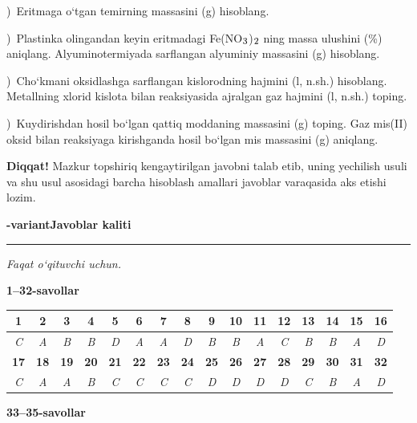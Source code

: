 \documentclass[11pt,a4paper]{article}
\renewcommand{\textsubscript}[1]{\ensuremath{_{\text{\fontsize{8}{8}\selectfont #1}}}}
\newcommand{\qsep}{\par\vspace{13pt}}
\newcommand{\diqqat}[1]{\par\smallskip\noindent\textbf{Diqqat!} #1\par\medskip}
\begin{document}
)\ Eritmaga o`tgan temirning massasini (g) hisoblang.\par
{})\ Plastinka olingandan keyin eritmadagi Fe(NO\textsubscript{3})\textsubscript{2} ning massa ulushini (\%) aniqlang. Alyuminotermiyada sarflangan alyuminiy massasini (g) hisoblang.\par
{})\ Cho`kmani oksidlashga sarflangan kislorodning hajmini (l, n.sh.) hisoblang. Metallning xlorid kislota bilan reaksiyasida ajralgan gaz hajmini (l, n.sh.) toping.\par
{})\ Kuydirishdan hosil bo`lgan qattiq moddaning massasini (g) toping. Gaz mis(II) oksid bilan reaksiyaga kirishganda hosil bo`lgan mis massasini (g) aniqlang.\par
\diqqat{Mazkur topshiriq kengaytirilgan javobni talab etib, uning yechilish usuli va shu usul asosidagi barcha hisoblash amallari javoblar varaqasida aks etishi lozim.}\qsep
\newpage
\noindent\textbf{\fontsize{13}{15}-variant}\hfill \textbf{Javoblar kaliti}\par\smallskip\hrule\smallskip
\textit{Faqat o`qituvchi uchun.}\par\medskip
\noindent\textbf{1--32-savollar}\par\smallskip
\noindent\begin{tabular}{|c|c|c|c|c|c|c|c|c|c|c|c|c|c|c|c|}\hline
\textbf{1} & \textbf{2} & \textbf{3} & \textbf{4} & \textbf{5} & \textbf{6} & \textbf{7} & \textbf{8} & \textbf{9} & \textbf{10} & \textbf{11} & \textbf{12} & \textbf{13} & \textbf{14} & \textbf{15} & \textbf{16}\\\hline
\textsl{C} & \textsl{A} & \textsl{B} & \textsl{B} & \textsl{D} & \textsl{A} & \textsl{A} & \textsl{D} & \textsl{B} & \textsl{B} & \textsl{A} & \textsl{C} & \textsl{B} & \textsl{B} & \textsl{A} & \textsl{D}\\\hline
\textbf{17} & \textbf{18} & \textbf{19} & \textbf{20} & \textbf{21} & \textbf{22} & \textbf{23} & \textbf{24} & \textbf{25} & \textbf{26} & \textbf{27} & \textbf{28} & \textbf{29} & \textbf{30} & \textbf{31} & \textbf{32}\\\hline
\textsl{C} & \textsl{A} & \textsl{A} & \textsl{B} & \textsl{C} & \textsl{C} & \textsl{C} & \textsl{C} & \textsl{D} & \textsl{D} & \textsl{D} & \textsl{D} & \textsl{C} & \textsl{B} & \textsl{A} & \textsl{D}\\\hline
\end{tabular}\par\medskip
\noindent\textbf{33--35-savollar}\par\smallskip
\end{document}
